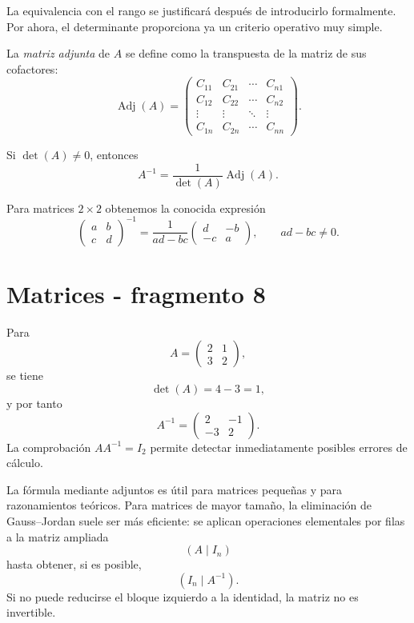 La equivalencia con el rango se justificará después de introducirlo formalmente. Por ahora, el determinante proporciona ya un criterio operativo muy simple.

\begin{definition}
La \emph{matriz adjunta} de $A$ se define como la transpuesta de la matriz de sus cofactores:
\[
\operatorname{Adj}(A)=
\begin{pmatrix}
C_{11}&C_{21}&\cdots&C_{n1}\\
C_{12}&C_{22}&\cdots&C_{n2}\\
\vdots&\vdots&\ddots&\vdots\\
C_{1n}&C_{2n}&\cdots&C_{nn}
\end{pmatrix}.
\]
\end{definition}

Si $\det(A)\neq0$, entonces
\[
\boxed{A^{-1}=\frac{1}{\det(A)}\operatorname{Adj}(A).}
\]

Para matrices $2\times2$ obtenemos la conocida expresión
\[
\begin{pmatrix}a&b\\c&d\end{pmatrix}^{-1}
=
\frac{1}{ad-bc}
\begin{pmatrix}d&-b\\-c&a\end{pmatrix},
\qquad ad-bc\neq0.
\]


\section{Matrices - fragmento 8}
\begin{example}
Para
\[
A=\begin{pmatrix}2&1\\3&2\end{pmatrix},
\]
se tiene
\[
\det(A)=4-3=1,
\]
y por tanto
\[
A^{-1}=\begin{pmatrix}2&-1\\-3&2\end{pmatrix}.
\]
La comprobación $AA^{-1}=I_2$ permite detectar inmediatamente posibles errores de cálculo.
\end{example}

La fórmula mediante adjuntos es útil para matrices pequeñas y para razonamientos teóricos. Para matrices de mayor tamaño, la eliminación de Gauss--Jordan suele ser más eficiente: se aplican operaciones elementales por filas a la matriz ampliada
\[
(A\mid I_n)
\]
hasta obtener, si es posible,
\[
(I_n\mid A^{-1}).
\]
Si no puede reducirse el bloque izquierdo a la identidad, la matriz no es invertible.

